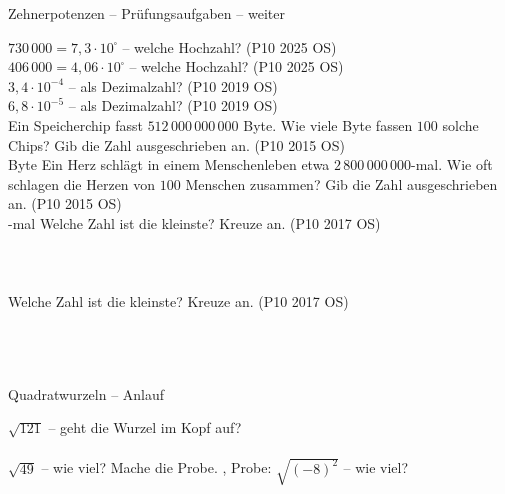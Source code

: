 \begin{aufgabe}{Zehnerpotenzen – Prüfungsaufgaben – weiter}
\begin{teile}
\teil $730\,000 = 7{,}3 \cdot 10^{\square}$ – welche Hochzahl? \hfill (P10 2025 OS) \\ \leerfeld
\teil $406\,000 = 4{,}06 \cdot 10^{\square}$ – welche Hochzahl? \hfill (P10 2025 OS) \\ \leerfeld
\teil $3{,}4 \cdot 10^{-4}$ – als Dezimalzahl? \hfill (P10 2019 OS) \\ \leerfeld
\teil $6{,}8 \cdot 10^{-5}$ – als Dezimalzahl? \hfill (P10 2019 OS) \\ \leerfeld
\teil Ein Speicherchip fasst $512\,000\,000\,000$ Byte. Wie viele Byte fassen $100$ solche Chips? Gib die Zahl ausgeschrieben an. \hfill (P10 2015 OS) \\ \leerfeld Byte
\teil Ein Herz schlägt in einem Menschenleben etwa $2\,800\,000\,000$-mal. Wie oft schlagen die Herzen von $100$ Menschen zusammen? Gib die Zahl ausgeschrieben an. \hfill (P10 2015 OS) \\ \leerfeld -mal
\teil Welche Zahl ist die kleinste? Kreuze an. \hfill (P10 2017 OS)\\  \\  \\  \\ 
\teil Welche Zahl ist die kleinste? Kreuze an. \hfill (P10 2017 OS)\\  \\  \\  \\ 
\end{teile}
\end{aufgabe}

\begin{aufgabe}{Quadratwurzeln – Anlauf}
\begin{teile}
\teil $\sqrt{121}$ – geht die Wurzel im Kopf auf?\\  \\ 
\teil $\sqrt{49}$ – wie viel? Mache die Probe. \leerfeld , Probe: \leerfeld
\teil $\sqrt{(-8)^2}$ – wie viel? \leerfeld
\end{teile}
\end{aufgabe}

